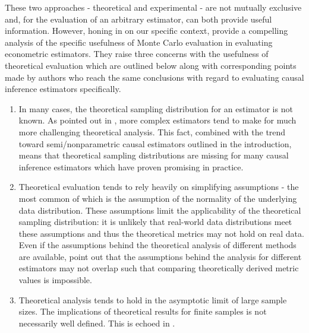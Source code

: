 \documentclass[../main.tex]{subfiles}
\begin{document}
\vspace{\baselineskip}
These two approaches - theoretical and experimental - are not mutually exclusive and, for the evaluation of an arbitrary estimator, can both provide useful information. However, honing in on our specific context, \cite{Paxton2001MonteImplementation} provide a compelling analysis of the specific usefulness of Monte Carlo evaluation in evaluating econometric estimators. They raise three concerns with the usefulness of theoretical evaluation which are outlined below along with corresponding points made by authors who reach the same conclusions with regard to evaluating causal inference estimators specifically.\par


\vspace{\baselineskip}
\begin{enumerate}
	\item In many cases, the theoretical sampling distribution for an estimator is not known. As pointed out in \cite{Knaus2018MachineEvidence}, more complex estimators tend to make for much more challenging theoretical analysis. This fact, combined with the trend toward semi/nonparametric causal estimators outlined in the introduction, means that theoretical sampling distributions are missing for many causal inference estimators which have proven promising in practice.\par


\vspace{\baselineskip}
	\item Theoretical evaluation tends to rely heavily on simplifying assumptions - the most common of which is the assumption of the normality of the underlying data distribution. These assumptions limit the applicability of the theoretical sampling distribution: it is unlikely that real-world data distributions meet these assumptions and thus the theoretical metrics may not hold on real data. Even if the assumptions behind the theoretical analysis of different methods are available, \cite{Knaus2018MachineEvidence} point out that the assumptions behind the analysis for different estimators may not overlap such that comparing theoretically derived metric values is impossible.\par


\vspace{\baselineskip}
	\item Theoretical analysis tends to hold in the asymptotic limit of large sample sizes. The implications of theoretical results for finite samples is not necessarily well defined. This is echoed in \cite{Huber2013TheScore}.
\end{enumerate}\par
\end{document}
